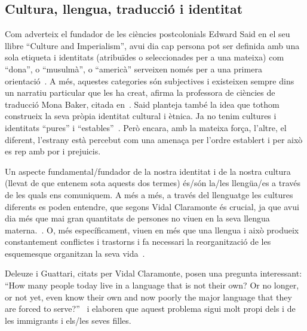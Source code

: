 \subsection{Cultura, llengua, traducció i identitat}
Com adverteix el fundador de les ciències postcolonials Edward Said en el seu llibre ``Culture and Imperialism'', avui dia cap persona pot ser definida amb una sola etiqueta
i identitats (atribuïdes o seleccionades per a una mateixa) com ``dona'', o ``musulmà'', o ``americà'' serveixen només per a una primera orientació~\autocite{Vidal2012}.
A més, aquestes categories són subjectives i existeixen sempre dins un narratiu particular que les ha creat, afirma la professora de ciències de traducció Mona Baker, citada en~\autocite{Vidal2012}.
Said planteja també la idea que tothom construeix la seva pròpia identitat cultural i ètnica.
Ja no tenim cultures i identitats ``pures'' i ``estables''~\autocite{Vidal2012}.
Però encara, amb la mateixa força, l'altre, el diferent, l'estrany està percebut com una amenaça per l'ordre establert i per això es rep amb por i prejuicis.

Un aspecte fundamental/fundador de la nostra identitat i de la nostra cultura (llevat de que entenem sota aquests dos termes) és/són la/les llengüa/es a través de les quals ens comuniquem.
A més a més, a través del llenguatge les cultures diferents es poden entendre, que segons Vidal Claramonte és crucial, ja que avui dia més que mai gran quantitats de persones no viuen en la seva llengua materna.~\autocite{Vidal2012}.
O, més específicament, viuen en més que una llengua i això produeix constantement conflictes i trastorns i fa necessari la reorganització de les esquemesque organitzan la seva vida~\autocite{Albin2005}.

Deleuze i Guattari, citats per Vidal Claramonte, posen una pregunta interessant:
``How many people today live in a language that is not their own? Or no longer, or not yet, even know their own and now poorly the major language that they are forced to serve?''~\autocite{Vidal2012}
i elaboren que aquest problema sigui molt propi dels i de les immigrants i els/les seves filles.

